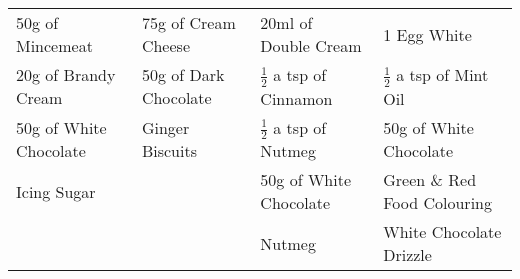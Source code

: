\documentclass[11pt, english]{article}
\begin{document}
\begin{center}
\begin{longtable}{p{4cm}p{4cm}p{4cm}p{4cm}}
        	50g of Mincemeat & 75g of Cream Cheese & 20ml of Double Cream & 1 Egg White\\
	        20g of Brandy Cream & 50g of Dark Chocolate & $\frac{1}{2}$ a tsp of Cinnamon & $\frac{1}{2}$ a tsp of Mint Oil\\
	        50g of White Chocolate & Ginger Biscuits & $\frac{1}{2}$ a tsp of Nutmeg & 50g of White Chocolate\\
	        Icing Sugar & & 50g of White Chocolate & Green \& Red Food Colouring\\
	        & & Nutmeg & White Chocolate Drizzle\\
	        \hline
	\end{longtable}
	\end{center}
\end{document}
